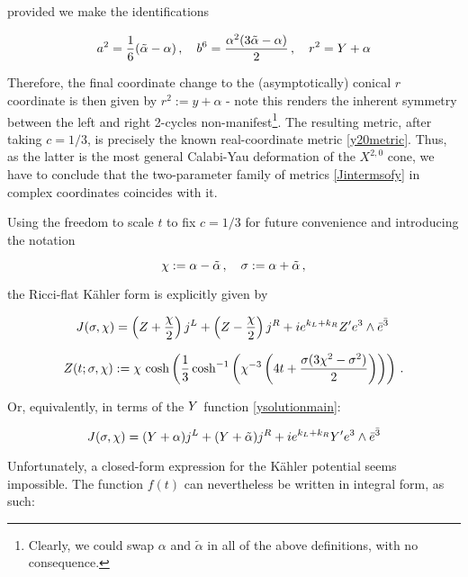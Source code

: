 provided we make the identifications

\begin{equation}
	a^2 = \frac{1}{6}(\tilde{\alpha} - \alpha)\,,\quad b^6 = \frac{\alpha^{2}(3\tilde{\alpha}-\alpha)}2\,,\quad r^2 = Y + \alpha
	\label{}
\end{equation}

Therefore, the final coordinate change to the (asymptotically) conical $r$ coordinate is then given by $r^2 := y + \alpha$ - note this renders the inherent symmetry between the left and right 2-cycles non-manifest\footnote{Clearly, we could swap $\alpha$ and $\tilde{\alpha}$ in all of the above definitions, with no consequence.}. The resulting metric, after taking $c=1/3$, is precisely the known real-coordinate metric \eqref{y20metric}. Thus, as the latter is the most general Calabi-Yau deformation of the $X^{2,0}$ cone, we have to conclude that the two-parameter family of metrics \eqref{Jintermsofy} in complex coordinates coincides with it.

Using the freedom to scale $t$ to fix $c=1/3$ for future convenience and introducing the notation 

\begin{equation}\label{convenientmoduli}
	\chi := \alpha - \tilde{\alpha}\,,\quad \sigma := \alpha + \tilde{\alpha}\,,
\end{equation}

the Ricci-flat K\"ahler form is explicitly given by

\begin{equation}
	J(\sigma,\chi) = \left(  Z + \frac{\chi}{2}\right) j^L + \left(Z-\frac{\chi}{2}\right) j^R + ie^{k_L + k_R} Z' e^3 \wedge \bar e^{\bar 3}\,
	\label{}
\end{equation}

\begin{equation}
	Z(t;\sigma,\chi) := \chi \,\cosh \left( \frac{1}{3} \cosh^{-1} \left(  \chi^{-3} \left( 4t + \frac{\sigma(3\chi^2 - \sigma^2)}{2} \right)  \right) \right) \,.
	\label{}
\end{equation}

Or, equivalently, in terms of the $Y$ function \eqref{ysolutionmain}:

\begin{equation}
	J(\sigma,\chi) = (Y+\alpha) j^L + (Y+\tilde{\alpha})j^R + ie^{k_L + k_R} Y' e^3 \wedge \bar e^{\bar 3}
	\label{}
\end{equation}

Unfortunately, a closed-form expression for the K\"ahler potential seems impossible. The function $f(t)$ can nevertheless be written in integral form, as such:

